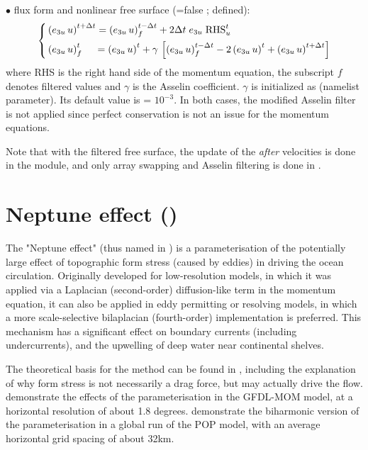 \documentclass[NEMO_book]{subfiles}
\begin{document}
$\bullet$ flux form and nonlinear free surface (=false ;  defined):
\begin{equation} \label{Eq_dynnxt_flux}
\left\{   \begin{aligned}
&\left(e_{3u}\,u\right)^{t+\Delta t} = \left(e_{3u}\,u\right)_f^{t-\Delta t} + 2\Delta t \; e_{3u} \;\text{RHS}_u^t  	\\
&\left(e_{3u}\,u\right)_f^t \;\quad = \left(e_{3u}\,u\right)^t
  +\gamma \,\left[ {\left(e_{3u}\,u\right)_f^{t-\Delta t} -2\left(e_{3u}\,u\right)^t+\left(e_{3u}\,u\right)^{t+\Delta t}} \right]
\end{aligned}   \right.
\end{equation} 
where RHS is the right hand side of the momentum equation, the subscript $f$ 
denotes filtered values and $\gamma$ is the Asselin coefficient. $\gamma$ is 
initialized as  (namelist parameter). Its default value is  = $10^{-3}$.
In both cases, the modified Asselin filter is not applied since perfect conservation 
is not an issue for the momentum equations.

Note that with the filtered free surface, the update of the \textit{after} velocities 
is done in the  module, and only array swapping
and Asselin filtering is done in .

\section  [Neptune effect (\textit{dynnept})]
                {Neptune effect ()}
\label{DYN_nept}

The "Neptune effect" (thus named in \citep{HollowayOM86}) is a
parameterisation of the potentially large effect of topographic form stress
(caused by eddies) in driving the ocean circulation. Originally developed for
low-resolution models, in which it was applied via a Laplacian (second-order)
diffusion-like term in the momentum equation, it can also be applied in eddy
permitting or resolving models, in which a more scale-selective bilaplacian
(fourth-order) implementation is preferred. This mechanism has a
significant effect on boundary currents (including undercurrents), and the
upwelling of deep water near continental shelves.

The theoretical basis for the method can be found in 
\citep{HollowayJPO92}, including the explanation of why form stress is not
necessarily a drag force, but may actually drive the flow. 
\citep{HollowayJPO94} demonstrate the effects of the parameterisation in
the GFDL-MOM model, at a horizontal resolution of about 1.8 degrees. 
\citep{HollowayOM08} demonstrate the biharmonic version of the
parameterisation in a global run of the POP model, with an average horizontal
grid spacing of about 32km.
\end{document}
